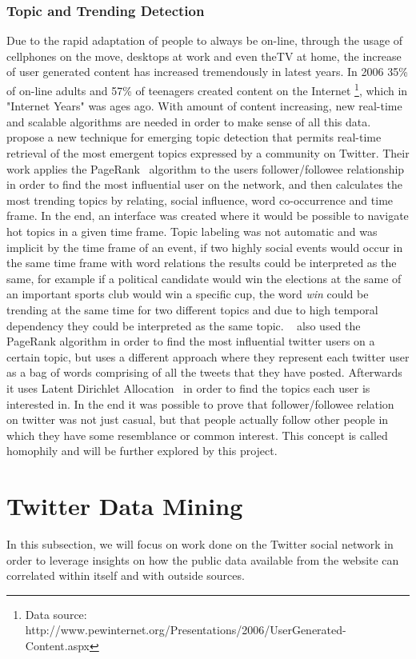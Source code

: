 \subsubsection{Topic and Trending Detection} 
\label{ssub:real_time_topic_and_trending_detection}
Due to the rapid adaptation of people to always be on-line, through the usage of cellphones on the move, desktops at work and even theTV at home, the increase of user generated content has increased tremendously in latest years. In 2006 35\% of on-line adults and 57\% of teenagers created content on the Internet \footnote{ Data source: http://www.pewinternet.org/Presentations/2006/UserGenerated-Content.aspx}, which in "Internet Years" was ages ago.
With amount of content increasing, new real-time and scalable algorithms are needed in order to make sense of all this data.
~\citet{Cataldi2010} propose a new technique for emerging topic detection that permits real-time retrieval of the most emergent topics expressed by a community on Twitter. Their work applies the PageRank~\cite{Pagerank1998} algorithm to the users follower/followee relationship in order to find the most influential user on the network, and then calculates the most trending topics by relating, social influence, word co-occurrence and time frame. In the end, an interface was created where it would be possible to navigate hot topics in a given time frame. Topic labeling was not automatic and was implicit by the time frame of an event, if two highly social events would occur in the same time frame with word relations the results could be interpreted as the same, for example if a political candidate would win the elections at the same of an important sports club would win a specific cup, the word \emph{win} could be trending at the same time for two different topics and due to high temporal dependency they could be interpreted as the same topic.
~\citet{Weng2010} also used the PageRank algorithm in order to find the most influential twitter users on a certain topic, but uses a different approach where they represent each twitter user as a bag of words comprising of all the tweets that they have posted. Afterwards it uses Latent Dirichlet Allocation~\cite{Blei2003} in order to find the topics each user is interested in. In the end it was possible to prove that follower/followee relation on twitter was not just casual, but that people actually follow other people in which they have some resemblance or common interest. This concept is called homophily and will be further explored by this project.

\section{Twitter Data Mining} 
\label{sec:data_mining_in_twitter_}
In this subsection, we will focus on work done on the Twitter social network in order to leverage insights on how the public data available from the website can correlated within itself and with outside sources. 

